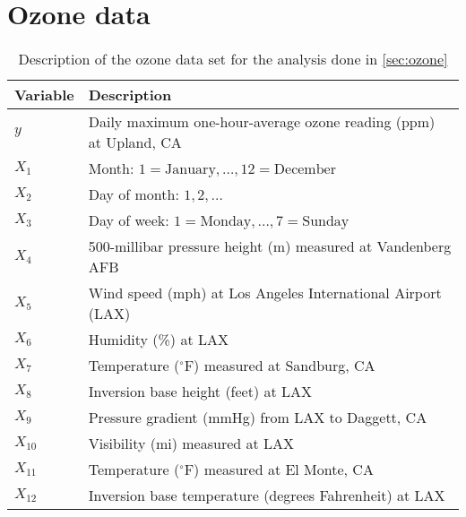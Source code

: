 \section{Ozone data}
\label{apx:ozone}

\begin{table}[H]
\centering
\caption{Description of the ozone data set for the analysis done in \cref{sec:ozone}}
\label{tab:ozone}
\begin{tabular}{ll}
\toprule
Variable     & Description \\
\midrule
$y$      & Daily maximum one-hour-average ozone reading (ppm) at Upland, CA \\
$X_1$    & Month: $1 = \text{January}, \dots, 12 = \text{December}$\\
$X_2$    & Day of month: $1,2,\dots$ \\
$X_3$    & Day of week: $1 = \text{Monday}, \dots, 7 = \text{Sunday}$ \\
$X_4$    & 500-millibar pressure height (m) measured at Vandenberg AFB \\
$X_5$    & Wind speed (mph) at Los Angeles International Airport (LAX) \\
$X_6$    & Humidity (\%) at LAX \\
$X_7$    & Temperature ($^\circ$F) measured at Sandburg, CA \\
$X_8$    & Inversion base height (feet) at LAX \\
$X_9$    & Pressure gradient (mmHg) from LAX to Daggett, CA \\
$X_{10}$ & Visibility (mi) measured at LAX \\
$X_{11}$ & Temperature ($^\circ$F) measured at El Monte, CA \\      
$X_{12}$ & Inversion base temperature (degrees Fahrenheit) at LAX \\             
\end{tabular}

\end{table}
